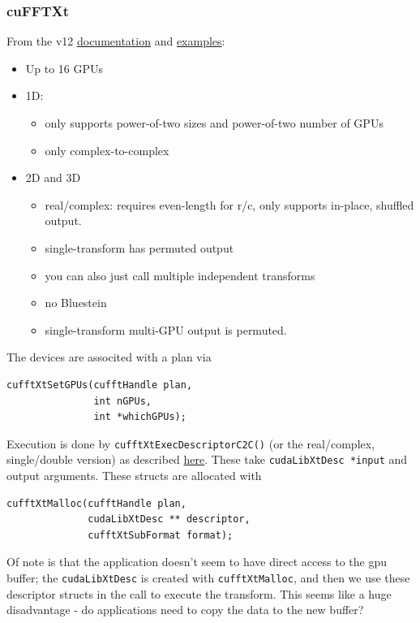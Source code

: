 \documentclass[12pt]{article}
\renewcommand{\(}{\left(}
\renewcommand{\)}{\right)}
\begin{document}
\subsubsection{cuFFTXt}
From the v12
\href{https://docs.nvidia.com/cuda/cufft/index.html#multiple-gpu-cufft-transforms}{documentation}
and
\href{https://docs.nvidia.com/cuda/cufft/index.html#cufft-code-examples}{examples}:
\begin{itemize}
\item Up to 16 GPUs
\item 1D:
  \begin{itemize}
  \item only supports power-of-two sizes and power-of-two number of
    GPUs
  \item only complex-to-complex
  \end{itemize}
\item 2D and 3D
  \begin{itemize}
  \item real/complex: requires even-length for r/c, only supports
    in-place, shuffled output.
  \item single-transform has permuted output
  \item you can also just call multiple independent transforms
  \item no Bluestein
  \item single-transform multi-GPU output is permuted.
  \end{itemize}
\end{itemize}
The devices are associted with a plan via
\begin{lstlisting}
cufftXtSetGPUs(cufftHandle plan,
               int nGPUs,
               int *whichGPUs);
\end{lstlisting}
Execution is done by \lstinline{cufftXtExecDescriptorC2C()} (or the
real/complex, single/double version) as described
\href{https://docs.nvidia.com/cuda/cufft/#multiple-gpu-2d-and-3d-transforms-on-permuted-input}{here}.
These take \lstinline{cudaLibXtDesc *input} and output arguments.
These structs are allocated with
\begin{lstlisting}
cufftXtMalloc(cufftHandle plan, 
              cudaLibXtDesc ** descriptor,
              cufftXtSubFormat format);
\end{lstlisting}
Of note is that the application doesn't seem to have direct access to
the gpu buffer; the \lstinline{cudaLibXtDesc} is created with
\lstinline{cufftXtMalloc}, and then we use these descriptor structs in
the call to execute the transform.  This seems like a huge
disadvantage - do applications need to copy the data to the new
buffer?
\end{document}
